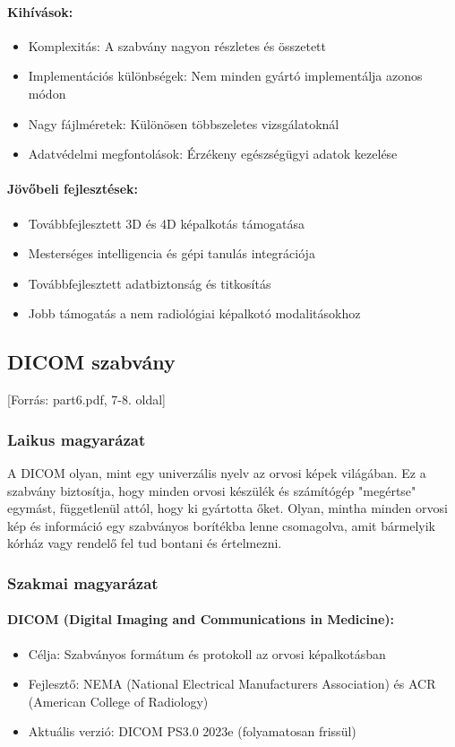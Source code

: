 \documentclass[a4paper,12pt]{article}
\begin{document}
\paragraph{Kihívások:} \begin{itemize} \item Komplexitás: A szabvány nagyon részletes és összetett \item Implementációs különbségek: Nem minden gyártó implementálja azonos módon \item Nagy fájlméretek: Különösen többszeletes vizsgálatoknál \item Adatvédelmi megfontolások: Érzékeny egészségügyi adatok kezelése \end{itemize}

\paragraph{Jövőbeli fejlesztések:} \begin{itemize} \item Továbbfejlesztett 3D és 4D képalkotás támogatása \item Mesterséges intelligencia és gépi tanulás integrációja \item Továbbfejlesztett adatbiztonság és titkosítás \item Jobb támogatás a nem radiológiai képalkotó modalitásokhoz \end{itemize}

\subsection{DICOM szabvány} [Forrás: part6.pdf, 7-8. oldal]

\subsubsection{Laikus magyarázat} A DICOM olyan, mint egy univerzális nyelv az orvosi képek világában. Ez a szabvány biztosítja, hogy minden orvosi készülék és számítógép "megértse" egymást, függetlenül attól, hogy ki gyártotta őket. Olyan, mintha minden orvosi kép és információ egy szabványos borítékba lenne csomagolva, amit bármelyik kórház vagy rendelő fel tud bontani és értelmezni.

\subsubsection{Szakmai magyarázat}

\paragraph{DICOM (Digital Imaging and Communications in Medicine):} \begin{itemize} \item Célja: Szabványos formátum és protokoll az orvosi képalkotásban \item Fejlesztő: NEMA (National Electrical Manufacturers Association) és ACR (American College of Radiology) \item Aktuális verzió: DICOM PS3.0 2023e (folyamatosan frissül) \end{itemize}
\end{document}
